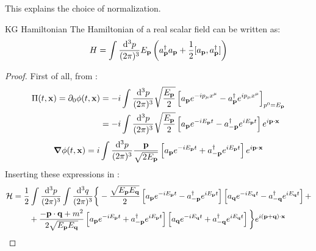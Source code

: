 This explains the choice of normalization.

\begin{proposition}{KG Hamiltonian}{}
  The Hamiltonian of a real scalar field can be written as:
  \begin{equation}
    H = \int \frac{\mathrm{d}^3 p}{(2\pi)^3} E_{\mathbf{p}} \left( a_{\mathbf{p}}^\dagger a_{\mathbf{p}} + \frac{1}{2} [a_{\mathbf{p}} , a_{\mathbf{p}}^\dagger] \right)
    \label{eq:kg-haml}
  \end{equation}
\end{proposition}

\begin{proofbox}
  \begin{proof}
    First of all, from :
    \begin{equation*}
      \begin{split}
        \Pi(t,\mathbf{x}) = \partial_0 \phi(t,\mathbf{x})
        &= -i \int \frac{\mathrm{d}^3 p}{(2\pi)^3} \sqrt{\frac{E_{\mathbf{p}}}{2}} \left[ a_{\mathbf{p}} e^{-i p_\mu x^\mu} - a_{\mathbf{p}}^\dagger e^{i p_\mu x^\mu} \right]_{p^0 = E_{\mathbf{p}}} \\
        &= -i \int \frac{\mathrm{d}^3 p}{(2\pi)^3} \sqrt{\frac{E_{\mathbf{p}}}{2}} \left[ a_{\mathbf{p}} e^{-i E_{\mathbf{p}} t} - a_{-\mathbf{p}}^\dagger e^{i E_{\mathbf{p}} t} \right] e^{i \mathbf{p} \cdot \mathbf{x}}
      \end{split}
    \end{equation*}
    \begin{equation*}
      \boldsymbol{\nabla} \phi(t,\mathbf{x}) = i \int \frac{\mathrm{d}^3 p}{(2\pi)^3} \frac{\mathbf{p}}{\sqrt{2E_{\mathbf{p}}}} \left[ a_{\mathbf{p}} e^{-i E_{\mathbf{p}} t} + a_{-\mathbf{p}}^\dagger e^{i E_{\mathbf{p}} t} \right] e^{i \mathbf{p} \cdot \mathbf{x}}
    \end{equation*}
    Inserting these expressions in :
    \begin{equation*}
      \begin{split}
        \ham
        &= \frac{1}{2} \int \frac{\dd^3 p}{(2\pi)^3} \int \frac{\dd^3 q}{(2\pi)^3} \bigg\{ - \frac{\sqrt{E_\ve{p} E_\ve{q}}}{2} \left[ a_\ve{p} e^{-i E_\ve{p} t} - a_{-\ve{p}}^\dagger e^{i E_\ve{p} t} \right] \left[ a_\ve{q} e^{-i E_\ve{q} t} - a_{-\ve{q}}^\dagger e^{i E_{\ve{q}} t} \right] + \\
        & \qquad + \frac{- \ve{p} \cdot \ve{q} + m^2}{2\sqrt{E_\ve{p} E_\ve{q}}} \left[ a_\ve{p} e^{-i E_\ve{p} t} + a_{-\ve{p}}^\dagger e^{i E_\ve{p} t} \right] \left[ a_\ve{q} e^{-i E_\ve{q} t} + a_{-\ve{q}}^\dagger e^{i E_\ve{q} t} \right] \bigg\} e^{i (\ve{p} + \ve{q}) \cdot \ve{x}}
      \end{split}

\end{equation*}
\end{proof}
\end{proofbox}
